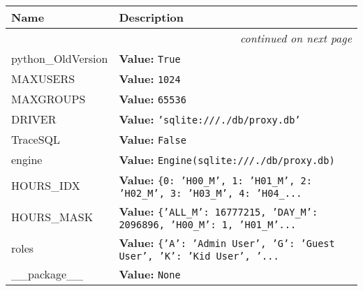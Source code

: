     \vspace{-1cm}
\hspace{\varindent}\begin{longtable}{|p{\varnamewidth}|p{\vardescrwidth}|l}
\cline{1-2}
\cline{1-2} \centering \textbf{Name} & \centering \textbf{Description}& \\
\cline{1-2}
\endhead\cline{1-2}\multicolumn{3}{r}{\small\textit{continued on next page}}\\\endfoot\cline{1-2}
\endlastfoot\raggedright p\-y\-t\-h\-o\-n\-\_\-O\-l\-d\-V\-e\-r\-s\-i\-o\-n\- & \raggedright \textbf{Value:} 
{\tt True}&\\
\cline{1-2}
\raggedright M\-A\-X\-U\-S\-E\-R\-S\- & \raggedright \textbf{Value:} 
{\tt 1024}&\\
\cline{1-2}
\raggedright M\-A\-X\-G\-R\-O\-U\-P\-S\- & \raggedright \textbf{Value:} 
{\tt 65536}&\\
\cline{1-2}
\raggedright D\-R\-I\-V\-E\-R\- & \raggedright \textbf{Value:} 
{\tt \texttt{'}\texttt{sqlite:///./db/proxy.db}\texttt{'}}&\\
\cline{1-2}
\raggedright T\-r\-a\-c\-e\-S\-Q\-L\- & \raggedright \textbf{Value:} 
{\tt False}&\\
\cline{1-2}
\raggedright e\-n\-g\-i\-n\-e\- & \raggedright \textbf{Value:} 
{\tt Engine(sqlite:///./db/proxy.db)}&\\
\cline{1-2}
\raggedright H\-O\-U\-R\-S\-\_\-I\-D\-X\- & \raggedright \textbf{Value:} 
{\tt \texttt{\{}0\texttt{: }\texttt{'}\texttt{H00\_M}\texttt{'}\texttt{, }1\texttt{: }\texttt{'}\texttt{H01\_M}\texttt{'}\texttt{, }2\texttt{: }\texttt{'}\texttt{H02\_M}\texttt{'}\texttt{, }3\texttt{: }\texttt{'}\texttt{H03\_M}\texttt{'}\texttt{, }4\texttt{: }\texttt{'}\texttt{H04\_}\texttt{...}}&\\
\cline{1-2}
\raggedright H\-O\-U\-R\-S\-\_\-M\-A\-S\-K\- & \raggedright \textbf{Value:} 
{\tt \texttt{\{}\texttt{'}\texttt{ALL\_M}\texttt{'}\texttt{: }16777215\texttt{, }\texttt{'}\texttt{DAY\_M}\texttt{'}\texttt{: }2096896\texttt{, }\texttt{'}\texttt{H00\_M}\texttt{'}\texttt{: }1\texttt{, }\texttt{'}\texttt{H01\_M}\texttt{'}\texttt{...}}&\\
\cline{1-2}
\raggedright r\-o\-l\-e\-s\- & \raggedright \textbf{Value:} 
{\tt \texttt{\{}\texttt{'}\texttt{A}\texttt{'}\texttt{: }\texttt{'}\texttt{Admin User}\texttt{'}\texttt{, }\texttt{'}\texttt{G}\texttt{'}\texttt{: }\texttt{'}\texttt{Guest User}\texttt{'}\texttt{, }\texttt{'}\texttt{K}\texttt{'}\texttt{: }\texttt{'}\texttt{Kid User}\texttt{'}\texttt{, }\texttt{'}\texttt{...}}&\\
\cline{1-2}
\raggedright \_\-\_\-p\-a\-c\-k\-a\-g\-e\-\_\-\_\- & \raggedright \textbf{Value:} 
{\tt None}&\\
\cline{1-2}
\end{longtable}


